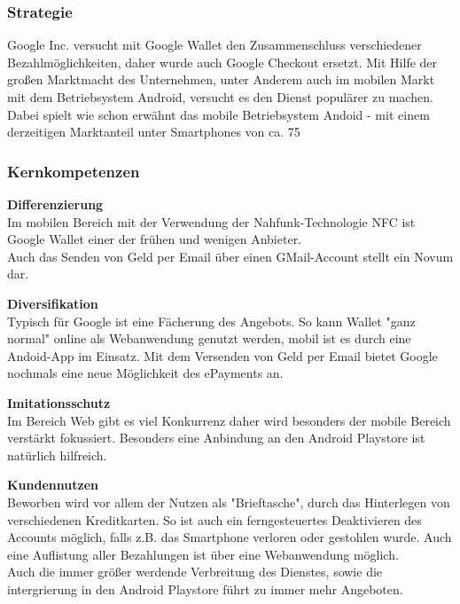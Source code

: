 	
\subsubsection{ Strategie}
Google Inc. versucht mit Google Wallet den Zusammenschluss verschiedener Bezahlmöglichkeiten, daher wurde auch Google Checkout ersetzt.
Mit Hilfe der großen Marktmacht des Unternehmen, unter Anderem auch im mobilen Markt mit dem Betriebsystem Android, versucht es den Dienst populärer zu machen. Dabei spielt wie schon erwähnt das mobile Betriebsystem Andoid - mit einem derzeitigen Marktanteil unter Smartphones von ca. 75%


\subsubsection{ Kernkompetenzen}
\textbf{Differenzierung}\\
Im mobilen Bereich mit der Verwendung der Nahfunk-Technologie NFC ist Google Wallet einer der frühen und wenigen Anbieter.\\
Auch das Senden von Geld per Email über einen GMail-Account stellt ein Novum dar.

\textbf{Diversifikation}\\
Typisch für Google ist eine Fächerung des Angebots. So kann Wallet "ganz normal" online als Webanwendung genutzt werden, mobil ist es durch eine Andoid-App im Einsatz. Mit dem Versenden von Geld per Email bietet Google nochmals eine neue Möglichkeit des ePayments an.

\textbf{Imitationsschutz}\\
Im Bereich Web gibt es viel Konkurrenz daher wird besonders der mobile Bereich verstärkt fokussiert. Besonders eine Anbindung an den Android Playstore ist natürlich hilfreich.

\textbf{Kundennutzen}\\
Beworben wird vor allem der Nutzen als "Brieftasche", durch das Hinterlegen von verschiedenen Kreditkarten. So ist auch ein ferngesteuertes Deaktivieren des Accounts möglich, falls z.B. das Smartphone verloren oder gestohlen wurde. Auch eine Auflistung aller Bezahlungen ist über eine Webanwendung möglich.\\
Auch die immer größer werdende Verbreitung des Dienstes, sowie die intergrierung in den Android Playstore führt zu immer mehr Angeboten.

